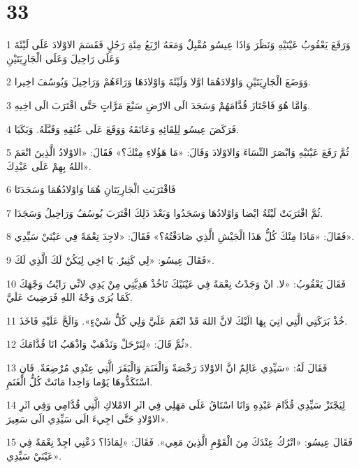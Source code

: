 \chapter{33}

\par 1 وَرَفَعَ يَعْقُوبُ عَيْنَيْهِ وَنَظَرَ وَاذَا عِيسُو مُقْبِلٌ وَمَعَهُ ارْبَعُ مِئَةِ رَجُلٍ فَقَسَمَ الاوْلادَ عَلَى لَيْئَةَ وَعَلَى رَاحِيلَ وَعَلَى الْجَارِيَتَيْنِ
\par 2 وَوَضَعَ الْجَارِيَتَيْنِ وَاوْلادَهُمَا اوَّلا وَلَيْئَةَ وَاوْلادَهَا وَرَاءَهُمْ وَرَاحِيلَ وَيُوسُفَ اخِيرا.
\par 3 وَامَّا هُوَ فَاجْتَازَ قُدَّامَهُمْ وَسَجَدَ الَى الارْضِ سَبْعَ مَرَّاتٍ حَتَّى اقْتَرَبَ الَى اخِيهِ.
\par 4 فَرَكَضَ عِيسُو لِلِقَائِهِ وَعَانَقَهُ وَوَقَعَ عَلَى عُنُقِهِ وَقَبَّلَهُ. وَبَكَيَا.
\par 5 ثُمَّ رَفَعَ عَيْنَيْهِ وَابْصَرَ النِّسَاءَ وَالاوْلادَ وَقَالَ: «مَا هَؤُلاءِ مِنْكَ؟» فَقَالَ: «الاوْلادُ الَّذِينَ انْعَمَ اللهُ بِهِمْ عَلَى عَبْدِكَ».
\par 6 فَاقْتَرَبَتِ الْجَارِيَتَانِ هُمَا وَاوْلادُهُمَا وَسَجَدَتَا
\par 7 ثُمَّ اقْتَرَبَتْ لَيْئَةُ ايْضا وَاوْلادُهَا وَسَجَدُوا وَبَعْدَ ذَلِكَ اقْتَرَبَ يُوسُفُ وَرَاحِيلُ وَسَجَدَا.
\par 8 فَقَالَ: «مَاذَا مِنْكَ كُلُّ هَذَا الْجَيْشِ الَّذِي صَادَفْتُهُ؟» فَقَالَ: «لاجِدَ نِعْمَةً فِي عَيْنَيْ سَيِّدِي».
\par 9 فَقَالَ عِيسُو: «لِي كَثِيرٌ. يَا اخِي لِيَكُنْ لَكَ الَّذِي لَكَ».
\par 10 فَقَالَ يَعْقُوبُ: «لا. انْ وَجَدْتُ نِعْمَةً فِي عَيْنَيْكَ تَاخُذْ هَدِيَّتِي مِنْ يَدِي لانِّي رَايْتُ وَجْهَكَ كَمَا يُرَى وَجْهُ اللهِ فَرَضِيتَ عَلَيَّ.
\par 11 خُذْ بَرَكَتِي الَّتِي اتِيَ بِهَا الَيْكَ لانَّ اللهَ قَدْ انْعَمَ عَلَيَّ وَلِي كُلُّ شَيْءٍ». وَالَحَّ عَلَيْهِ فَاخَذَ.
\par 12 ثُمَّ قَالَ: «لِنَرْحَلْ وَنَذْهَبْ وَاذْهَبُ انَا قُدَّامَكَ».
\par 13 فَقَالَ لَهُ: «سَيِّدِي عَالِمٌ انَّ الاوْلادَ رَخْصَةٌ وَالْغَنَمَ وَالْبَقَرَ الَّتِي عِنْدِي مُرْضِعَةٌ. فَانِ اسْتَكَدُّوهَا يَوْما وَاحِدا مَاتَتْ كُلُّ الْغَنَمِ.
\par 14 لِيَجْتَزْ سَيِّدِي قُدَّامَ عَبْدِهِ وَانَا اسْتَاقُ عَلَى مَهَلِي فِي اثَرِ الامْلاكِ الَّتِي قُدَّامِي وَفِي اثَرِ الاوْلادِ حَتَّى اجِيءَ الَى سَيِّدِي الَى سَعِيرَ».
\par 15 فَقَالَ عِيسُو: «اتْرُكُ عِنْدَكَ مِنَ الْقَوْمِ الَّذِينَ مَعِي». فَقَالَ: «لِمَاذَا؟ دَعْنِي اجِدْ نِعْمَةً فِي عَيْنَيْ سَيِّدِي».
